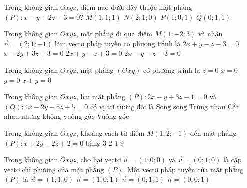 \begin{ex}%
Trong không gian $Oxyz$, điểm nào dưới đây thuộc mặt phẳng $(P)\colon x - y + 2z - 3 = 0$?
\choice
{$M(1; 1; 1)$}
{$N(2; 1; 0)$}
{\True $P(1; 0; 1)$}
{$Q(0; 1; 1)$}
\end{ex}

\begin{ex}%
Trong không gian $Oxyz$, mặt phẳng đi qua điểm $M(1; -2; 3)$ và nhận $\overrightarrow{n} = (2; 1; -1)$ làm vectơ pháp tuyến có phương trình là
\choice
{$2x + y - z - 3 = 0$}
{$x - 2y + 3z + 3 = 0$}
{\True $2x + y - z + 3 = 0$}
{$2x - y - z + 3 = 0$}
\end{ex}

\begin{ex}%
Trong không gian $Oxyz$, mặt phẳng $(Oxy)$ có phương trình là
\choice
{\True $z = 0$}
{$x = 0$}
{$y = 0$}
{$x + y = 0$}
\end{ex}

\begin{ex}%
Trong không gian $Oxyz$, hai mặt phẳng $(P)\colon 2x - y + 3z - 1 = 0$ và $(Q)\colon 4x - 2y + 6z + 5 = 0$ có vị trí tương đối là
\choice
{\True Song song}
{Trùng nhau}
{Cắt nhau nhưng không vuông góc}
{Vuông góc}
\end{ex}

\begin{ex}%
Trong không gian $Oxyz$, khoảng cách từ điểm $M(1; 2; -1)$ đến mặt phẳng $(P)\colon x + 2y - 2z + 2 = 0$ bằng
\choice
{\True $3$}
{$2$}
{$1$}
{$9$}
\end{ex}

\begin{ex}%
Trong không gian $Oxyz$, cho hai vectơ $\overrightarrow{u} = (1; 0; 0)$ và $\overrightarrow{v} = (0; 1; 0)$ là cặp vectơ chỉ phương của mặt phẳng $(P)$. Một vectơ pháp tuyến của mặt phẳng $(P)$ là
\choice
{$\overrightarrow{n} = (1; 1; 0)$}
{$\overrightarrow{n} = (1; 0; 1)$}
{$\overrightarrow{n} = (0; 1; 1)$}
{\True $\overrightarrow{n} = (0; 0; 1)$}
\end{ex}

